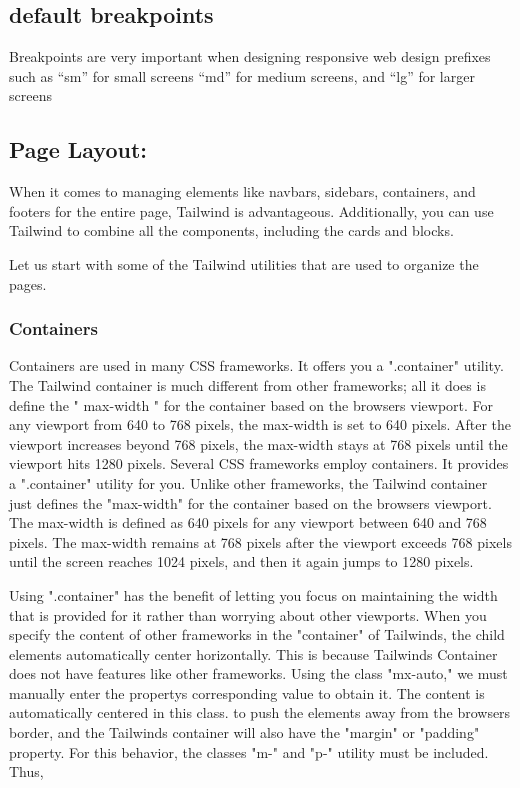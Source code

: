\documentclass[conference]{IEEEtran}
\begin{document}
\subsection{default breakpoints}

Breakpoints are very important when designing responsive web design prefixes such as ``sm'' for small screens ``md'' for medium screens, and ``lg'' for larger screens

\subsection{Page Layout:}

When it comes to managing elements like navbars, sidebars, containers, and footers for the entire page, Tailwind is advantageous. Additionally, you can use Tailwind to combine all the components, including the cards and blocks.

Let us start with some of the Tailwind utilities that are used to
organize the pages.

\subsubsection{\textbf{Containers} }

Containers are used in many CSS frameworks. It offers you a ".container" utility. The Tailwind container is much different from other frameworks; all it does is define the " max-width " for the container based on the browser\textquotesingle s viewport. For any viewport from 640 to 768 pixels, the max-width is set to 640 pixels. After the viewport increases beyond 768 pixels, the max-width stays at 768 pixels until the viewport hits 1280 pixels. Several CSS frameworks employ containers. It provides a ".container" utility for you. Unlike other frameworks, the Tailwind container just defines the "max-width" for the container based on the browser\textquotesingle s viewport. The max-width is defined as 640 pixels for any viewport between 640 and 768 pixels. The max-width remains at 768 pixels after the viewport exceeds 768 pixels until the screen reaches 1024 pixels, and then it again jumps to 1280 pixels.

Using ".container" has the benefit of letting you focus on maintaining the width that is provided for it rather than worrying about other viewports. When you specify the content of other frameworks in the "container" of Tailwinds, the child elements automatically center horizontally. This is because Tailwinds Container does not have features
like other frameworks. Using the class "mx-auto," we must manually enter the property\textquotesingle s corresponding value to obtain it. The content is automatically centered in this class. to push the elements away from the browser\textquotesingle s border, and the Tailwinds
container will also have the "margin" or "padding" property. For this behavior, the classes "m-" and "p-" utility must be included. Thus,
\end{document}
